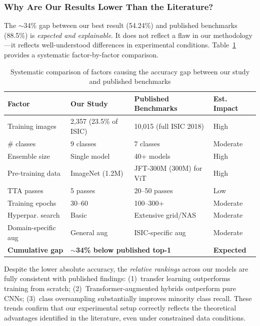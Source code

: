 \documentclass[10pt,twocolumn]{article}
\begin{document}
\subsubsection{Why Are Our Results Lower Than the Literature?}

The $\sim$34\% gap between our best result (54.24\%) and published benchmarks (88.5\%) is \textit{expected and explainable}. It does not reflect a flaw in our methodology---it reflects well-understood differences in experimental conditions. Table~\ref{tab:gap_analysis} provides a systematic factor-by-factor comparison.

\begin{table}[htbp]
\centering
\caption{Systematic comparison of factors causing the accuracy gap between our study and published benchmarks}
\label{tab:gap_analysis}
\small
\begin{tabular}{p{1.9cm}p{1.9cm}p{2.0cm}p{0.8cm}}
\toprule
\textbf{Factor} & \textbf{Our Study} & \textbf{Published Benchmarks} & \textbf{Est. Impact} \\
\midrule
Training images & 2,357 (23.5\% of ISIC) & 10,015 (full ISIC 2018) & High \\
\# classes & 9 classes & 7 classes & Moderate \\
Ensemble size & Single model & 40+ models & High \\
Pre-training data & ImageNet (1.2M) & JFT-300M (300M) for ViT & High \\
TTA passes & 5 passes & 20--50 passes & Low \\
Training epochs & 30--60 & 100--300+ & Moderate \\
Hyperpar. search & Basic & Extensive grid/NAS & Moderate \\
Domain-specific aug & General aug & ISIC-specific aug & Moderate \\
\midrule
\textbf{Cumulative gap} & \multicolumn{2}{l}{\textbf{$\sim$34\% below published top-1}} & \textbf{Expected} \\
\bottomrule
\end{tabular}
\end{table}

Despite the lower absolute accuracy, the \textit{relative rankings} across our models are fully consistent with published findings: (1)~transfer learning outperforms training from scratch; (2)~Transformer-augmented hybrids outperform pure CNNs; (3)~class oversampling substantially improves minority class recall. These trends confirm that our experimental setup correctly reflects the theoretical advantages identified in the literature, even under constrained data conditions.
\end{document}
